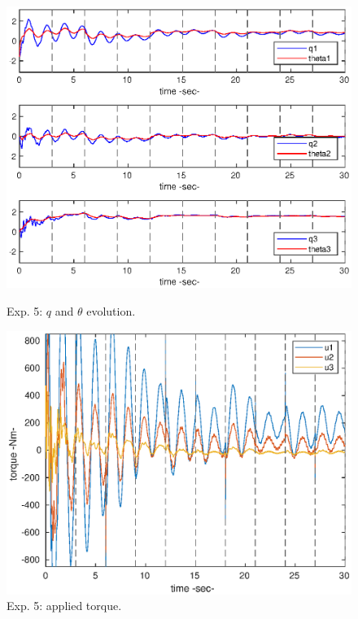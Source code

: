 \begin{center}
\begin{figure}[h!]
\begin{minipage}[h!]{0.45\linewidth}
\includegraphics[scale=0.5]{figures/5_lowqthetaplot.eps}
\caption{\label{5_qt}Exp. 5: \(q\) and \(\theta\) evolution.}
\includegraphics[scale=0.5]{figures/5_loweffortplot.eps}
\caption{\label{5_u}Exp. 5: applied torque.}
\label{fig:assumpt}
\end{minipage}
\end{figure}
\end{center}